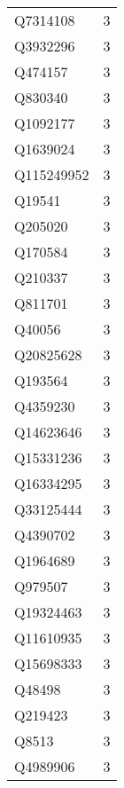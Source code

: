 \begin{tabular}{lr}
    Q7314108 &                             3 \\
    Q3932296 &                             3 \\
     Q474157 &                             3 \\
     Q830340 &                             3 \\
    Q1092177 &                             3 \\
    Q1639024 &                             3 \\
  Q115249952 &                             3 \\
      Q19541 &                             3 \\
     Q205020 &                             3 \\
     Q170584 &                             3 \\
     Q210337 &                             3 \\
     Q811701 &                             3 \\
      Q40056 &                             3 \\
   Q20825628 &                             3 \\
     Q193564 &                             3 \\
    Q4359230 &                             3 \\
   Q14623646 &                             3 \\
   Q15331236 &                             3 \\
   Q16334295 &                             3 \\
   Q33125444 &                             3 \\
    Q4390702 &                             3 \\
    Q1964689 &                             3 \\
     Q979507 &                             3 \\
   Q19324463 &                             3 \\
   Q11610935 &                             3 \\
   Q15698333 &                             3 \\
      Q48498 &                             3 \\
     Q219423 &                             3 \\
       Q8513 &                             3 \\
    Q4989906 &                             3 \\

\end{tabular}
